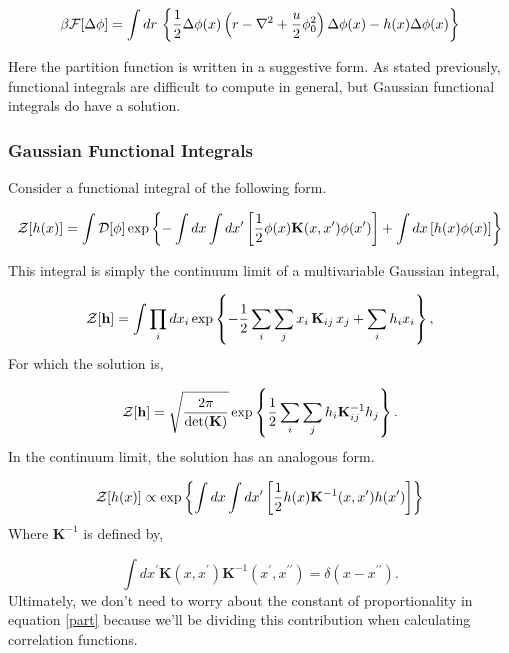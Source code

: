 \begin{equation}
\beta\mathcal{F}[\Delta\phi] = \int dr \,\left\lbrace \frac{1}{2}\Delta\phi(x) \left(r - \nabla^2 + \frac{u}{2}\phi_0^2\right) \Delta\phi(x) - h(x)\Delta\phi(x) \right\rbrace
\end{equation}

Here the partition function is written in a suggestive form. As stated previously, functional integrals are difficult to compute in general, but Gaussian functional integrals do have a solution.

\subsubsection{Gaussian Functional Integrals}

Consider a functional integral of the following form.

\begin{equation}
\mathcal{Z}[h(x)] = \int \mathcal{D}[\phi] \exp\left\lbrace - \int dx \int dx^\prime \left[ \frac{1}{2}\phi(x) \mathbf{K}(x, x^\prime) \phi(x^\prime)\right] +  \int dx \left[h(x) \phi(x)\right]\right\rbrace
\end{equation}

This integral is simply the continuum limit of a multivariable Gaussian integral,

\begin{equation}
\mathcal{Z}[\mathbf{h}] = \int \prod_i dx_i \exp \left\lbrace - \frac{1}{2}\sum_i \sum_j x_i\, \mathbf{K}_{ij}\, x_j  + \sum_i h_i x_i\right\rbrace,
\end{equation}
For which the solution is,

\begin{equation}
\mathcal{Z}[\mathbf{h}] = \sqrt{\frac{2\pi}{\det(\mathbf{K})}} \exp\left\lbrace \frac{1}{2} \sum_i \sum_j h_i \mathbf{K}_{ij}^{-1} h_j\right\rbrace.
\end{equation}
In the continuum limit, the solution has an analogous form.

\begin{equation}\label{part}
\mathcal{Z}[h(x)] \propto \exp\left\lbrace \int dx \int dx^\prime \left[ \frac{1}{2}h(x) \mathbf{K}^{-1}(x, x^\prime) h(x^\prime)\right] \right\rbrace
\end{equation}
Where $\mathbf{K}^{-1}$ is defined by,

\begin{equation}
\int dx^\prime \mathbf{K}(x, x^\prime)\mathbf{K}^{-1}(x^\prime, x^{\prime\prime}) = \delta(x - x^{\prime\prime}).
\end{equation}
Ultimately, we don't need to worry about the constant of proportionality in equation \ref{part} because we'll be dividing this contribution when calculating correlation functions.

